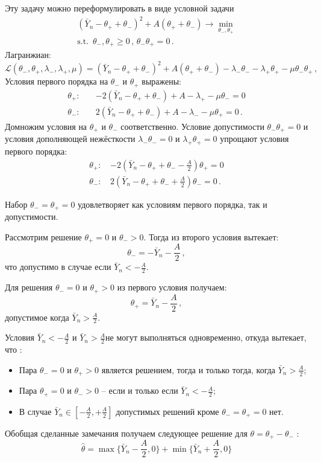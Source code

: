 \documentclass[a4paper]{article}
\begin{document}
Эту задачу можно переформулировать в виде условной задачи 
\begin{align*}
	(\bar{Y}_n - \theta_+ + \theta_-)^2 + A (\theta_+ + \theta_- ) \to \min_{\theta_-,\theta_+}\\
	\text{s.t. }\, \theta_-,\theta_+ \geq 0\,,\, \theta_- \theta_+ = 0\,.
\end{align*}
Лагранжиан:
\[
\mathcal{L} (\theta_-, \theta_+,\lambda_-,\lambda_+,\mu) =
	(\bar{Y}_n - \theta_+ + \theta_-)^2 + A (\theta_+ + \theta_- )
	- \lambda_- \theta_- - \lambda_+ \theta_+ - \mu \theta_- \theta_+ \,,
\]
Условия первого порядка на $\theta_-$ и $\theta_+$ выражены:
\begin{align*}
	\theta_+:\quad & - 2(\bar{Y}_n - \theta_+ + \theta_- ) + A - \lambda_+ - \mu \theta_- = 0\\
	\theta_-:\quad&   2(\bar{Y}_n - \theta_+ + \theta_- ) + A - \lambda_- - \mu \theta_+ = 0\,.
\end{align*}
Домножим условия на $\theta_+$ и $\theta_-$ соответственно. Условие допустимости
$\theta_- \theta_+ = 0$ и условия дополняющей нежёсткости $\lambda_-\theta_- =0$
и $\lambda_+\theta_+ = 0$ упрощают условия первого порядка:
\begin{align*}
	\theta_+:\, & - 2(\bar{Y}_n - \theta_+ + \theta_- - \frac{A}{2} ) \theta_+ = 0\\
	\theta_-:\, &   2(\bar{Y}_n - \theta_+ + \theta_- + \frac{A}{2} ) \theta_- = 0\,.
\end{align*}

Набор $\theta_- = \theta_+ = 0$ удовлетворяет как условиям первого порядка,
так и допустимости.

Рассмотрим решение $\theta_+ = 0$ и $\theta_- > 0$. Тогда из второго условия
вытекает:
\[ \theta_- = - \bar{Y}_n - \frac{A}{2}\,, \]
что допустимо в случае если $\bar{Y}_n < -\tfrac{A}{2}$.

Для решения $\theta_- = 0$ и $\theta_+ > 0$ из первого условия получаем:
\[ \theta_+ = \bar{Y}_n - \frac{A}{2} \,, \]
допустимое когда $\bar{Y}_n > \tfrac{A}{2}$.

Условия $\bar{Y}_n < -\tfrac{A}{2}$ и $\bar{Y}_n > \tfrac{A}{2}$не могут выполняться
одновременно, откуда вытекает, что :
\begin{itemize}
	\item Пара $\theta_- = 0$ и $\theta_+ > 0$ является решением, тогда и только тогда,
	когда $\bar{Y}_n > \tfrac{A}{2}$;
	\item Пара $\theta_+ = 0$ и $\theta_- > 0$ -- если и только если $\bar{Y}_n < -\tfrac{A}{2}$;
	\item В случае $\bar{Y}_n\in [-\tfrac{A}{2}, +\tfrac{A}{2}]$ допустимых решений кроме
	$\theta_- = \theta_+ = 0$ нет.
\end{itemize}
Обобщая сделанные замечания получаем следующее решение для $\theta = \theta_+-\theta_-$ :
\[
\hat{\theta}
= \max\bigl\{ \bar{Y}_n - \frac{A}{2}, 0 \bigr\}
+ \min\bigl\{ \bar{Y}_n + \frac{A}{2}, 0 \bigr\}
\]
\end{document}
